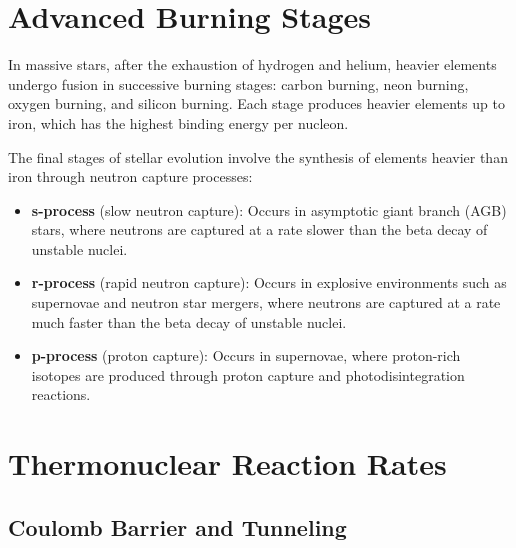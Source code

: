 \section{Advanced Burning Stages}
\begin{foundation}
In massive stars, after the exhaustion of hydrogen and helium, heavier elements undergo fusion in successive burning stages: carbon burning, neon burning, oxygen burning, and silicon burning. Each stage produces heavier elements up to iron, which has the highest binding energy per nucleon.
\end{foundation}

\begin{theory}
The final stages of stellar evolution involve the synthesis of elements heavier than iron through neutron capture processes:
\begin{itemize}
    \item \textbf{s-process} (slow neutron capture): Occurs in asymptotic giant branch (AGB) stars, where neutrons are captured at a rate slower than the beta decay of unstable nuclei.
    \item \textbf{r-process} (rapid neutron capture): Occurs in explosive environments such as supernovae and neutron star mergers, where neutrons are captured at a rate much faster than the beta decay of unstable nuclei.   
    \item \textbf{p-process} (proton capture): Occurs in supernovae, where proton-rich isotopes are produced through proton capture and photodisintegration reactions.
\end{itemize}
\end{theory}


\section{Thermonuclear Reaction Rates}

\subsection{Coulomb Barrier and Tunneling}

